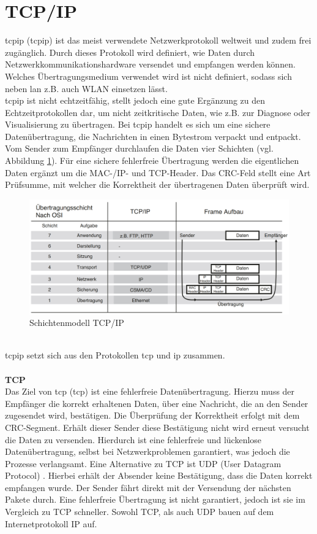 \documentclass[ a4paper,
                oneside,
                toc=bibliography,
                toc=listof
                ]{scrbook}
\begin{document}
	\section{TCP/IP}
	\ac{tcpip} (\acl{tcpip}) ist das meist verwendete Netzwerkprotokoll weltweit und zudem frei zugänglich. Durch dieses Protokoll wird definiert, wie Daten durch Netzwerkkommunikationshardware versendet und empfangen werden können. Welches Übertragungsmedium verwendet wird ist  nicht definiert, sodass sich neben \ac{lan} z.B. auch WLAN einsetzen lässt.\cite{CS9_TCP} \cite{kim2016service} \\
	\ac{tcpip} ist nicht echtzeitfähig, stellt jedoch eine gute Ergänzung zu den Echtzeitprotokollen dar, um nicht zeitkritische Daten, wie z.B. zur Diagnose oder Visualisierung zu übertragen. Bei \ac{tcpip} handelt es sich um eine sichere Datenübertragung, die Nachrichten in einen Bytestrom verpackt und entpackt. Vom Sender zum Empfänger durchlaufen die Daten vier Schichten (vgl. Abbildung \ref{fig:Schichtenmodell}). Für eine sichere fehlerfreie Übertragung werden die eigentlichen Daten ergänzt um die MAC-/IP- und TCP-Header. Das CRC-Feld stellt eine Art Prüfsumme, mit welcher die Korrektheit der übertragenen Daten überprüft wird. \cite{hering2012elektrotechnik}
	\begin{figure}[!ht]
		\centering
		\includegraphics[width=1.0\linewidth]{./images/Schichtenmodell_TCP_IP.png}
		\caption{Schichtenmodell TCP/IP \cite{hering2012elektrotechnik}}
		\label{fig:Schichtenmodell}
	\end{figure} \\
	\ac{tcpip} setzt sich aus den Protokollen \acs{tcp} und \acs{ip} zusammen.\\
	\\
	\textbf{TCP}\\
	Das Ziel von \acs{tcp} (\acl{tcp}) ist eine fehlerfreie Datenübertragung. Hierzu muss der Empfänger die korrekt erhaltenen Daten, über eine Nachricht, die an den Sender zugesendet wird, bestätigen. Die Überprüfung der Korrektheit erfolgt mit dem CRC-Segment. Erhält dieser Sender diese Bestätigung nicht wird erneut versucht die Daten zu versenden. Hierdurch ist eine fehlerfreie und lückenlose Datenübertragung, selbst bei Netzwerkproblemen garantiert, was jedoch die Prozesse verlangsamt. Eine Alternative zu TCP ist UDP (User Datagram Protocol) . Hierbei erhält der Absender keine Bestätigung, dass die Daten korrekt empfangen wurde. Der Sender fährt direkt mit der Versendung der nächsten Pakete durch. Eine fehlerfreie Übertragung ist nicht garantiert, jedoch ist sie im Vergleich zu TCP schneller. Sowohl TCP, als auch UDP bauen auf dem Internetprotokoll IP auf. \cite{CS9_TCP}\\
\end{document}
